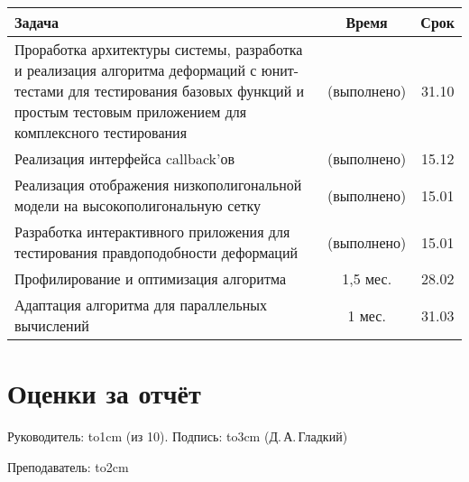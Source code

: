 \documentclass[a4paper, 14pt, titlepage]{extarticle}
\newcommand{\underscore}[1]{\hbox to#1{\hrulefill}}
\newcommand{\eng}[1]{{\English #1}}
\begin{document}
    \begin{center}
      \begin{tabular}{|p{10.3cm}|c|c|}\hline
        Задача                                       & Время         & Срок  \\\hline\hline
        Проработка архитектуры системы, разработка и реализация алгоритма деформаций
        с юнит-тестами для тестирования базовых функций и простым тестовым приложением
        для комплексного тестирования                & (выполнено)   & 31.10 \\\hline
        Реализация интерфейса \eng{callback}'ов & (выполнено)   & 15.12 \\\hline
        Реализация отображения низкополигональной
        модели на высокополигональную сетку          & (выполнено)   & 15.01 \\\hline
        Разработка интерактивного приложения для
        тестирования правдоподобности деформаций     & (выполнено)   & 15.01 \\\hline
        Профилирование и оптимизация алгоритма       & 1,5 мес.      & 28.02 \\\hline
        Адаптация алгоритма для параллельных
        вычислений                                   & 1 мес.        & 31.03 \\\hline
      \end{tabular}
    \end{center}

  \section{Оценки за отчёт}

    Руководитель: \underscore{1cm} (из 10). Подпись: \underscore{3cm} (Д.\,А.\,Гладкий)

    \vspace{0.5cm}
    Преподаватель: \underscore{2cm}


  \begin{flushleft}
    
  \end{flushleft}
\end{document}
